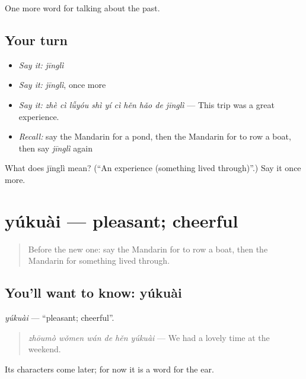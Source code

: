 \begin{grammarlens}[title={What you've built}]
One more word for talking about the past.
\end{grammarlens}

\subsection*{Your turn}
\begin{itemize}
\raggedright
  \item \emph{Say it:} \emph{jīnglì}
  \item \emph{Say it:} \emph{jīnglì}, once more
  \item \emph{Say it:} \emph{zhè cì lǚyóu shì yí cì hěn hǎo de jīnglì} — This trip was a great experience.
  \item \emph{Recall:} say the Mandarin for a pond, then the Mandarin for to row a boat, then say \emph{jīnglì} again
\end{itemize}

\begin{tcolorbox}[breakable,colback=teal!4,colframe=teal!35!black,title={Before you move on}]
What does jīnglì mean? (\textquotedblleft{}An experience (something lived through)\textquotedblright{}.) Say it once more.
\end{tcolorbox}
\section[yúkuài]{yúkuài — pleasant; cheerful}

\label{lesson:ZH-C247-yukuai}



\begin{quote}
Before the new one: say the Mandarin for to row a boat, then the Mandarin for something lived through.
\end{quote}

\subsection*{You'll want to know: yúkuài}
\emph{yúkuài} — \textquotedblleft{}pleasant; cheerful\textquotedblright{}.

\begin{quote}
\emph{zhōumò wǒmen wán de hěn yúkuài} — We had a lovely time at the weekend.
\end{quote}

Its characters come later; for now it is a word for the ear.

